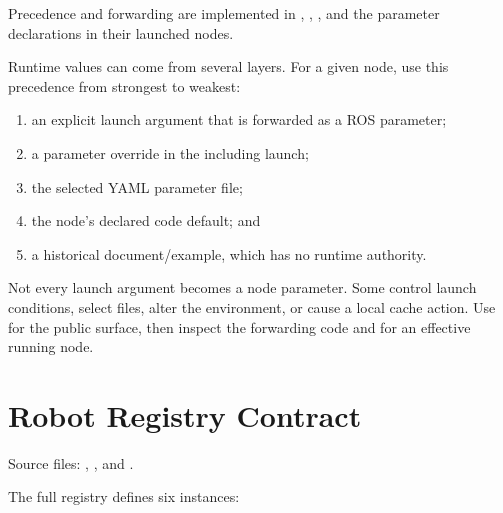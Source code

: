 Precedence and forwarding are implemented in
,
,
, and
the parameter declarations in their launched nodes.

Runtime values can come from several layers. For a given node, use this
precedence from strongest to weakest:

\begin{enumerate}
  \item an explicit launch argument that is forwarded as a ROS parameter;
  \item a parameter override in the including launch;
  \item the selected YAML parameter file;
  \item the node's declared code default; and
  \item a historical document/example, which has no runtime authority.
\end{enumerate}

Not every launch argument becomes a node parameter. Some control launch
conditions, select files, alter the environment, or cause a local cache action.
Use  for the public surface, then inspect the
forwarding code and  for an effective running node.

\section{Robot Registry Contract}

Source files: ,
, and
.

The full registry defines six instances:

